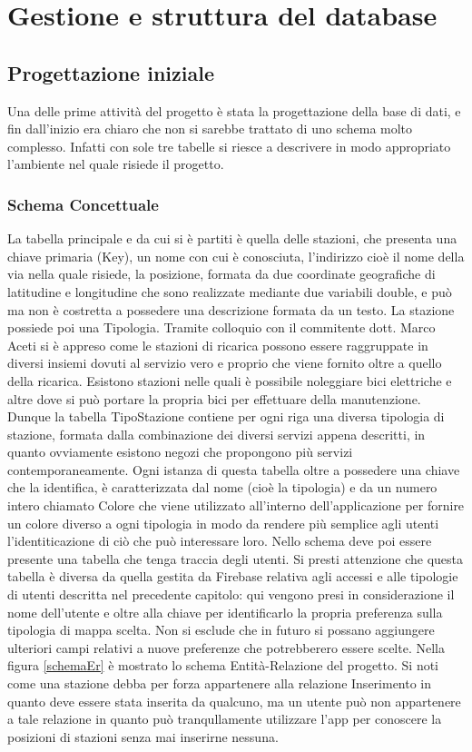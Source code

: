\section{Gestione e struttura del database}

\subsection{Progettazione iniziale}
Una delle prime attività del progetto è stata la progettazione della base di
dati, e fin dall'inizio era chiaro che non si sarebbe trattato di uno schema
molto complesso. Infatti con sole tre tabelle si riesce a descrivere in modo
appropriato l'ambiente nel quale risiede il progetto.
\subsubsection{Schema Concettuale}
 La tabella principale e da cui si è partiti è
quella delle stazioni, che presenta una chiave primaria (Key), un nome con
cui è conosciuta, l'indirizzo cioè il nome della via nella quale risiede, la
posizione, formata da due coordinate geografiche di latitudine e longitudine che
sono realizzate mediante due variabili double, e
può ma non è costretta a possedere una descrizione formata da un testo. La
stazione possiede poi una Tipologia. Tramite colloquio con il commitente dott.
Marco  Aceti si è appreso come le stazioni di ricarica possono essere
raggruppate
in diversi insiemi dovuti al servizio vero e proprio che viene fornito oltre a
quello della ricarica. Esistono stazioni nelle quali è possibile noleggiare bici
elettriche e altre dove si può portare la propria bici per effettuare della manutenzione.
Dunque la tabella TipoStazione contiene per ogni riga una diversa tipologia di
stazione, formata dalla combinazione dei diversi servizi appena descritti, in
quanto ovviamente esistono negozi che propongono più servizi contemporaneamente.
Ogni istanza di questa tabella oltre a possedere una chiave che la identifica,
è caratterizzata dal nome (cioè la tipologia) e da un numero intero chiamato
Colore che viene utilizzato all'interno dell'applicazione per fornire un colore
diverso a ogni tipologia in modo da rendere più semplice agli utenti
l'identiticazione di ciò che può interessare loro. Nello schema deve poi essere
presente una tabella che tenga traccia degli utenti. Si presti attenzione che
questa tabella è diversa da quella gestita da Firebase relativa agli accessi e
alle tipologie di utenti descritta nel precedente capitolo: qui vengono presi in
considerazione il nome dell'utente e oltre alla chiave per identificarlo la
propria preferenza sulla tipologia di mappa scelta. Non si esclude che in futuro
si possano aggiungere ulteriori campi relativi a nuove preferenze che
potrebberero essere scelte. Nella figura \ref{schemaEr} è mostrato lo schema Entità-Relazione
del progetto. Si noti come una stazione debba per forza appartenere alla
relazione Inserimento in quanto deve essere stata inserita da qualcuno, ma un
utente può non appartenere a tale relazione in quanto può tranqullamente
utilizzare l'app per conoscere la posizioni di stazioni senza mai inserirne nessuna.

